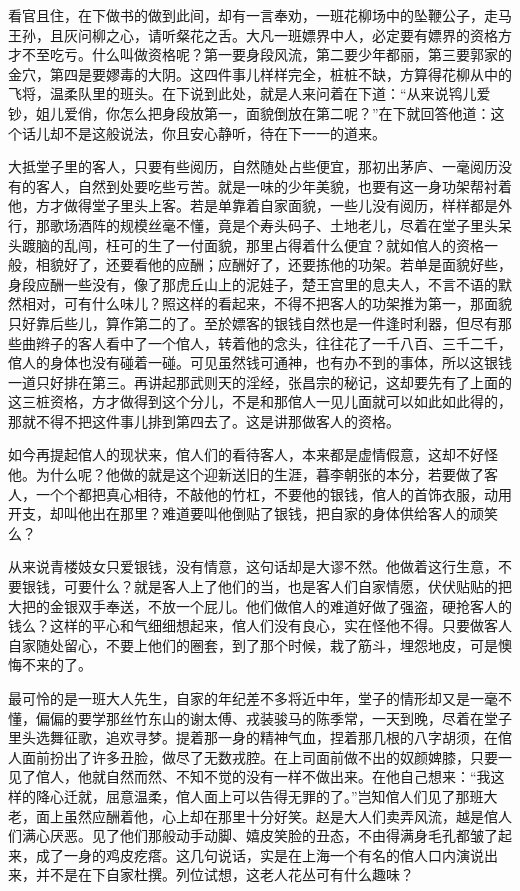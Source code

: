 \documentclass[12pt,UTF8]{ctexbook}
\begin{document}
{{{看官且住，在下做书的做到此间，却有一言奉劝，一班花柳场中的坠鞭公子，走马王孙，且灰问柳之心，请听粲花之舌。大凡一班嫖界中人，必定要有嫖界的资格方才不至吃亏。什么叫做资格呢？第一要身段风流，第二要少年都丽，第三要郭家的金穴，第四是要嫪毒的大阴。这四件事儿样样完全，桩桩不缺，方算得花柳从中的飞将，温柔队里的班头。在下说到此处，就是人来问着在下道：“从来说鸨儿爱钞，姐儿爱俏，你怎么把身段放第一，面貌倒放在第二呢？”在下就回答他道：这个话儿却不是这般说法，你且安心静听，待在下一一的道来。

大抵堂子里的客人，只要有些阅历，自然随处占些便宜，那初出茅庐、一毫阅历没有的客人，自然到处要吃些亏苦。就是一味的少年美貌，也要有这一身功架帮衬着他，方才做得堂子里头上客。若是单靠着自家面貌，一些儿没有阅历，样样都是外行，那歌场酒阵的规模丝毫不懂，竟是个寿头码子、土地老儿，尽着在堂子里头呆头踱脑的乱闯，枉可的生了一付面貌，那里占得着什么便宜？就如倌人的资格一般，相貌好了，还要看他的应酬；应酬好了，还要拣他的功架。若单是面貌好些，身段应酬一些没有，像了那虎丘山上的泥娃子，楚王宫里的息夫人，不言不语的默然相对，可有什么味儿？照这样的看起来，不得不把客人的功架推为第一，那面貌只好靠后些儿，算作第二的了。至於嫖客的银钱自然也是一件逢时利器，但尽有那些曲辫子的客人看中了一个倌人，转着他的念头，往往花了一千八百、三千二千，倌人的身体也没有碰着一碰。可见虽然钱可通神，也有办不到的事体，所以这银钱一道只好排在第三。再讲起那武则天的淫经，张昌宗的秘记，这却要先有了上面的这三桩资格，方才做得到这个分儿，不是和那倌人一见儿面就可以如此如此得的，那就不得不把这件事儿排到第四去了。这是讲那做客人的资格。

如今再提起倌人的现状来，倌人们的看待客人，本来都是虚情假意，这却不好怪他。为什么呢？他做的就是这个迎新送旧的生涯，暮李朝张的本分，若要做了客人，一个个都把真心相待，不敲他的竹杠，不要他的银钱，倌人的首饰衣服，动用开支，却叫他出在那里？难道要叫他倒贴了银钱，把自家的身体供给客人的顽笑么？

从来说青楼妓女只爱银钱，没有情意，这句话却是大谬不然。他做着这行生意，不要银钱，可要什么？就是客人上了他们的当，也是客人们自家情愿，伏伏贴贴的把大把的金银双手奉送，不放一个屁儿。他们做倌人的难道好做了强盗，硬抢客人的钱么？这样的平心和气细细想起来，倌人们没有良心，实在怪他不得。只要做客人自家随处留心，不要上他们的圈套，到了那个时候，栽了筋斗，埋怨地皮，可是懊悔不来的了。

最可怜的是一班大人先生，自家的年纪差不多将近中年，堂子的情形却又是一毫不懂，偏偏的要学那丝竹东山的谢太傅、戎装骏马的陈季常，一天到晚，尽着在堂子里头选舞征歌，追欢寻梦。提着那一身的精神气血，捏着那几根的八字胡须，在倌人面前扮出了许多丑脸，做尽了无数戎腔。在上司面前做不出的奴颜婢膝，只要一见了倌人，他就自然而然、不知不觉的没有一样不做出来。在他自己想来：“我这样的降心迁就，屈意温柔，倌人面上可以告得无罪的了。”岂知倌人们见了那班大老，面上虽然应酬着他，心上却在那里十分好笑。赵是大人们卖弄风流，越是倌人们满心厌恶。见了他们那般动手动脚、嬉皮笑脸的丑态，不由得满身毛孔都皱了起来，成了一身的鸡皮疙瘩。这几句说话，实是在上海一个有名的倌人口内演说出来，并不是在下自家杜撰。列位试想，这老人花丛可有什么趣味？

}}}
\end{document}
